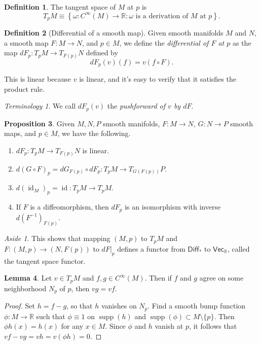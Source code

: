 \documentclass[10pt,letterpaper,cm]{nupset}
\theoremstyle{definition}
\newtheorem{definition}{Definition}[subsection]
\theoremstyle{theorem}
\newtheorem{lemma}[definition]{Lemma}
\newtheorem{prop}[definition]{Proposition}
\theoremstyle{remark}
\newtheorem*{aside}{Aside}
\newtheorem*{term}{Terminology}
\newcommand{\R}{\mathbb R}
\newcommand{\1}{\mathbf{1}}
\newcommand{\0}{\vec 0}
\DeclareMathOperator{\id}{id}
\DeclareMathOperator{\supp}{supp}
\begin{document}
\begin{definition}
The tangent space of $M$ at $p$ is 
$$T_pM \equiv \left\{\omega : C^{\infty}(M) \to \R : \omega \text{ is a derivation of $M$ at }p\right\}.$$
\end{definition}

\begin{definition}[Differential of a smooth map]
Given smooth manifolds $M$ and $N$, a smooth map $F: M \to N$, and $p\in M$,  we define the \textit{differential of $F$ at $p$} as the map $dF_p: T_pM \to T_{F(p)}N$ defined by $$dF_p(v)(f) = v(f \circ F).$$
\end{definition}

This is linear because $v$ is linear, and it's easy to verify that it satisfies the product rule. 

\begin{term}
We call $dF_p(v)$ the \textit{pushforward of $v$ by $dF$}.
\end{term}

\begin{prop}
Given $M, N, P$ smooth manifolds, $F: M \to N$, $G: N \to P$ smooth maps, and $p\in M$, we have the following.
\begin{enumerate}
\item $dF_p: T_pM \to T_{F(p)}N$ is linear. 
\item $d(G \circ F)_p = dG_{F(p)} \circ dF_p : T_pM \to T_{G(F(p))}P$.
\item $d(\id_M)_p = \id : T_pM \to T_pM$.
\item If $F$ is a diffeomorphism, then $dF_p$ is an isomorphism with inverse $d(F^{-1})_{F(p)}$.
\end{enumerate}
\end{prop}

\begin{aside}
This shows that mapping $(M, p)$ to $T_pM$ and $F: (M, p) \to(N, F(p))$ to $dF\bigr\rvert_p$ defines a functor from $\mathsf{Diff}_{\ast}$ to $\mathsf{Vec}_{\R}$, called the tangent space functor.
\end{aside}

\begin{lemma}
Let $v \in T_pM$ and $f, g\in C^{\infty}(M)$. Then if $f$ and $g$ agree on some neighborhood $N_p$ of $p$, then $vg = vf$. 
\end{lemma}
\begin{proof}
Set $h = f-g$, so that $h$ vanishes on $N_p$. Find a smooth bump function $\phi: M \to \R$ such that $\phi \equiv 1$ on $\supp(h)$ and $\supp(\phi) \subset M \setminus \{p\}$. Then $\phi h(x) = h(x)$ for any $x\in M$. Since $\phi$ and $h$ vanish at $p$, it follows that $vf -vg = vh = v(\phi h) = 0.$
\end{proof}
\end{document}
